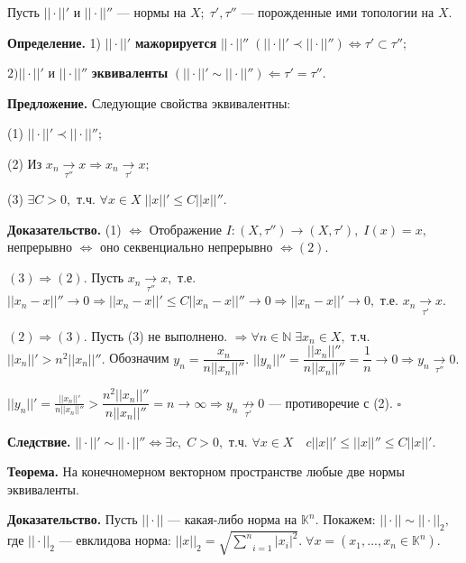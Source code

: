 \documentclass[12pt,a4paper]{article}
\begin{document}
Пусть $||\cdot||'$ и $||\cdot||''$ --- нормы на $X; \; \tau', \tau''$ --- порожденные ими топологии на $X.$

\textbf{Определение.} 1) $||\cdot||'$ \textbf{мажорируется} $||\cdot||'' \; (||\cdot||' \prec ||\cdot||'') \Leftrightarrow \tau' \subset \tau'';$

$2) ||\cdot||'$ и $||\cdot||''$ \textbf{эквиваленты} $(||\cdot||' \sim ||\cdot||'') \Leftarrow \tau' = \tau''.$

\textbf{Предложение.} Следующие свойства эквивалентны:

(1) $||\cdot||' \prec ||\cdot||'';$

(2) Из $x_{n} \underset{\tau''}{\to} x \Rightarrow x_{n} \underset{\tau'}{\to} x;$

(3) $\exists C > 0,$ т.ч. $\forall x \in X \; ||x||' \leq C||x||''.$

\textbf{Доказательство.} (1) $\Leftrightarrow$ Отображение $I\!: (X, \tau'') \to (X, \tau'), \; I(x) = x,$ непрерывно $\Leftrightarrow$ оно секвенциально непрерывно $\Leftrightarrow (2).$

$(3) \Rightarrow (2).$ Пусть $x_{n} \underset{\tau''}{\to} x,$ т.е. $||x_{n} - x||'' \to 0 \Rightarrow ||x_{n} - x||' \leq C||x_{n} - x||'' \to 0 \Rightarrow ||x_{n} - x||' \to 0,$ т.е. $x_{n} \underset{\tau'}{\to} x.$

$(2) \Rightarrow (3).$ Пусть (3) не выполнено. $\Rightarrow \forall n \in \mathbb{N} \; \exists x_{n} \in X,$ т.ч. $||x_{n}||' > n^{2}||x_{n}||''.$ Обозначим $y_{n} = \dfrac{x_{n}}{n||x_{n}||''}.$ $||y_{n}||'' = \dfrac{||x_{n}||''}{n||x_{n}||''} = \dfrac{1}{n} \to 0 \Rightarrow y_{n} \underset{\tau''}{\to} 0.$

$||y_{n}||' = \frac{||x_{n}||'}{n||x_{n}||''} > \dfrac{n^{2}||x_{n}||''}{n||x_{n}||''} = n \to \infty \Rightarrow y_{n} \underset{\tau'}{\not \to} 0$ --- противоречие с (2). $\square$

\textbf{Следствие.} $||\cdot||' \sim ||\cdot||'' \Leftrightarrow \exists c, \; C > 0,$ т.ч. $\forall x \in X \quad c||x||' \leq ||x||'' \leq C||x||'.$

\textbf{Теорема.} На конечномерном векторном пространстве любые две нормы эквиваленты. 

\textbf{Доказательство.} Пусть $||\cdot||$ --- какая-либо норма на $\mathbb{K}^{n}.$ Покажем: $||\cdot|| \sim ||\cdot||_{2},$ где $||\cdot||_{2}$ --- евклидова норма: $||x||_{2} = \sqrt{\underset{i = 1}{\overset{n}{\sum}} |x_{i}|^{2}}. \; \forall x = (x_{1}, ..., x_{n} \in \mathbb{K}^{n}).$ 
\end{document}
